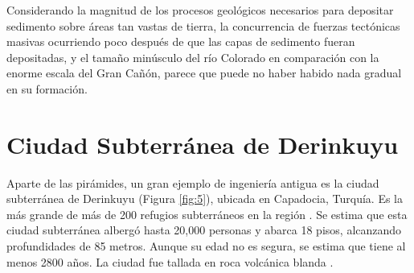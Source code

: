 \documentclass[10pt,twocolumn,letterpaper]{article}
\begin{document}
Considerando la magnitud de los procesos geológicos necesarios para depositar sedimento sobre áreas tan vastas de tierra, la concurrencia de fuerzas tectónicas masivas ocurriendo poco después de que las capas de sedimento fueran depositadas, y el tamaño minúsculo del río Colorado en comparación con la enorme escala del Gran Cañón, parece que puede no haber habido nada gradual en su formación.

\section{Ciudad Subterránea de Derinkuyu}

Aparte de las pirámides, un gran ejemplo de ingeniería antigua es la ciudad subterránea de Derinkuyu (Figura \ref{fig:5}), ubicada en Capadocia, Turquía. Es la más grande de más de 200 refugios subterráneos en la región \cite{54}. Se estima que esta ciudad subterránea albergó hasta 20,000 personas y abarca 18 pisos, alcanzando profundidades de 85 metros. Aunque su edad no es segura, se estima que tiene al menos 2800 años. La ciudad fue tallada en roca volcánica blanda \cite{52, 53}.
\end{document}
